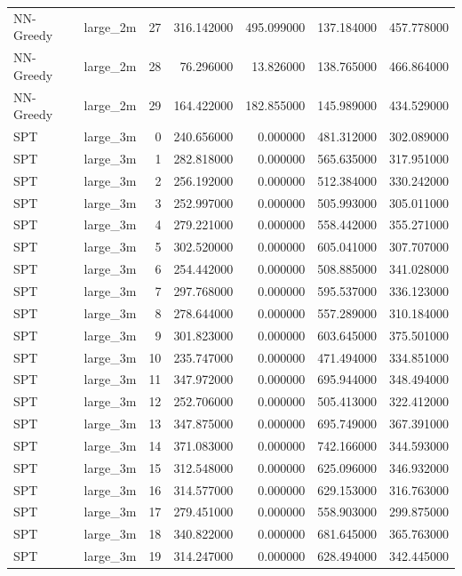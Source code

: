 \begin{tabular}{llrrrrr}
NN-Greedy & large_2m & 27 & 316.142000 & 495.099000 & 137.184000 & 457.778000 \\
NN-Greedy & large_2m & 28 & 76.296000 & 13.826000 & 138.765000 & 466.864000 \\
NN-Greedy & large_2m & 29 & 164.422000 & 182.855000 & 145.989000 & 434.529000 \\
SPT & large_3m & 0 & 240.656000 & 0.000000 & 481.312000 & 302.089000 \\
SPT & large_3m & 1 & 282.818000 & 0.000000 & 565.635000 & 317.951000 \\
SPT & large_3m & 2 & 256.192000 & 0.000000 & 512.384000 & 330.242000 \\
SPT & large_3m & 3 & 252.997000 & 0.000000 & 505.993000 & 305.011000 \\
SPT & large_3m & 4 & 279.221000 & 0.000000 & 558.442000 & 355.271000 \\
SPT & large_3m & 5 & 302.520000 & 0.000000 & 605.041000 & 307.707000 \\
SPT & large_3m & 6 & 254.442000 & 0.000000 & 508.885000 & 341.028000 \\
SPT & large_3m & 7 & 297.768000 & 0.000000 & 595.537000 & 336.123000 \\
SPT & large_3m & 8 & 278.644000 & 0.000000 & 557.289000 & 310.184000 \\
SPT & large_3m & 9 & 301.823000 & 0.000000 & 603.645000 & 375.501000 \\
SPT & large_3m & 10 & 235.747000 & 0.000000 & 471.494000 & 334.851000 \\
SPT & large_3m & 11 & 347.972000 & 0.000000 & 695.944000 & 348.494000 \\
SPT & large_3m & 12 & 252.706000 & 0.000000 & 505.413000 & 322.412000 \\
SPT & large_3m & 13 & 347.875000 & 0.000000 & 695.749000 & 367.391000 \\
SPT & large_3m & 14 & 371.083000 & 0.000000 & 742.166000 & 344.593000 \\
SPT & large_3m & 15 & 312.548000 & 0.000000 & 625.096000 & 346.932000 \\
SPT & large_3m & 16 & 314.577000 & 0.000000 & 629.153000 & 316.763000 \\
SPT & large_3m & 17 & 279.451000 & 0.000000 & 558.903000 & 299.875000 \\
SPT & large_3m & 18 & 340.822000 & 0.000000 & 681.645000 & 365.763000 \\
SPT & large_3m & 19 & 314.247000 & 0.000000 & 628.494000 & 342.445000 \\

\end{tabular}
